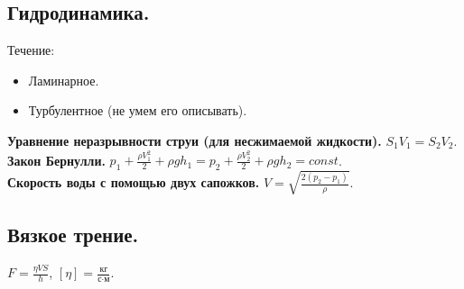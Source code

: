 \documentclass{article}
\begin{document}
	\subsection{Гидродинамика.}
	Течение:
	\begin{itemize}
		\item Ламинарное.
		\item Турбулентное (не умем его описывать).
	\end{itemize}
	\textbf{Уравнение неразрывности струи (для несжимаемой жидкости).} $S_1V_1 = S_2V_2$. \\
	\textbf{Закон Бернулли.} $p_1 + \frac{\rho V_1^2}{2} + \rho g h_1 = p_2 + \frac{\rho V_2^2}{2} + \rho g h_2 = const$. \\
	\textbf{Скорость воды с помощью двух сапожков.} $V = \sqrt{\frac{2(p_2 - p_1)}{\rho}}$.
	\subsection{Вязкое трение.}
	$F = \frac{\eta V S}{h}$, $[\eta] = \frac{\text{кг}}{\text{с} \cdot \text{м}}$.
\end{document}
